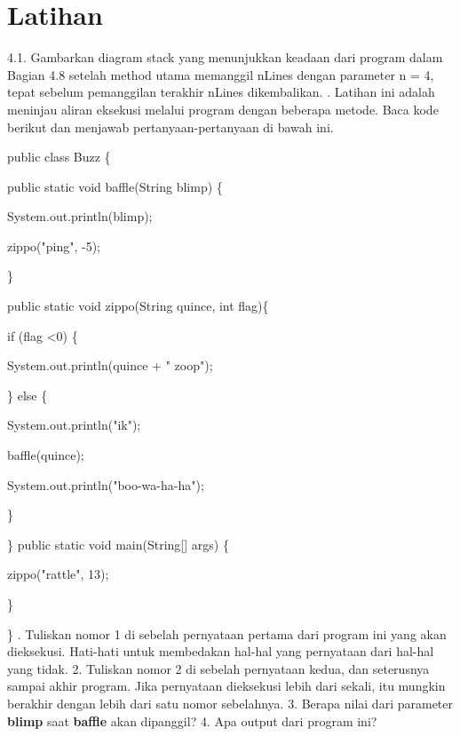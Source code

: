 \section{Latihan}
4.1. Gambarkan diagram stack yang menunjukkan keadaan dari program dalam Bagian 4.8 setelah method utama memanggil nLines dengan parameter n = 4, tepat sebelum pemanggilan terakhir nLines dikembalikan.
. Latihan ini adalah meninjau aliran eksekusi melalui program dengan beberapa metode. Baca kode berikut dan menjawab pertanyaan-pertanyaan di bawah ini.
\par
public class Buzz \{
	\par
	public static void baffle(String blimp) \{
		\par
		System.out.println(blimp);
		\par
		zippo("ping", -5);
		\par
	\}
	\newline
	\par
	public static void zippo(String quince, int flag)\{
		\par
		if (flag \textless 0) \{
			\par
			System.out.println(quince + " zoop");
			\par
		\} else \{
		\par
		System.out.println("ik");
		\par
		baffle(quince);
		\par
		System.out.println("boo-wa-ha-ha");
		\par
	\}
			\par
\}
\newline
\newline
public static void main(String[] args) \{
	\par
	zippo("rattle", 13);
	\par
\}
\par
\}
\newline
{}. Tuliskan nomor 1 di sebelah pernyataan pertama dari program ini yang akan dieksekusi. Hati-hati untuk membedakan hal-hal yang pernyataan dari hal-hal yang tidak.
2. Tuliskan nomor 2 di sebelah pernyataan kedua, dan seterusnya sampai akhir program. Jika pernyataan dieksekusi lebih dari sekali, itu mungkin berakhir dengan lebih dari satu nomor sebelahnya.
3. Berapa nilai dari parameter \textbf{blimp} saat \textbf{baffle} akan dipanggil?
4. Apa output dari program ini?
\newline
\newline
